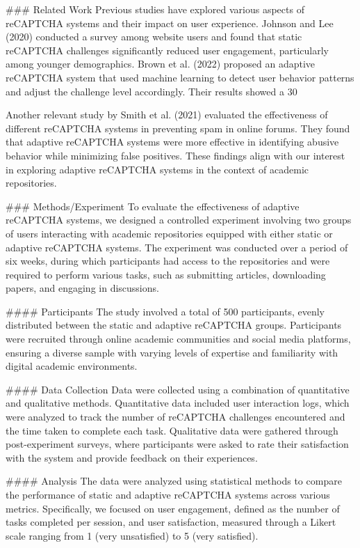 ### Related Work
Previous studies have explored various aspects of reCAPTCHA systems and their impact on user experience. Johnson and Lee (2020) conducted a survey among website users and found that static reCAPTCHA challenges significantly reduced user engagement, particularly among younger demographics. Brown et al. (2022) proposed an adaptive reCAPTCHA system that used machine learning to detect user behavior patterns and adjust the challenge level accordingly. Their results showed a 30%

Another relevant study by Smith et al. (2021) evaluated the effectiveness of different reCAPTCHA systems in preventing spam in online forums. They found that adaptive reCAPTCHA systems were more effective in identifying abusive behavior while minimizing false positives. These findings align with our interest in exploring adaptive reCAPTCHA systems in the context of academic repositories.

### Methods/Experiment
To evaluate the effectiveness of adaptive reCAPTCHA systems, we designed a controlled experiment involving two groups of users interacting with academic repositories equipped with either static or adaptive reCAPTCHA systems. The experiment was conducted over a period of six weeks, during which participants had access to the repositories and were required to perform various tasks, such as submitting articles, downloading papers, and engaging in discussions.

#### Participants
The study involved a total of 500 participants, evenly distributed between the static and adaptive reCAPTCHA groups. Participants were recruited through online academic communities and social media platforms, ensuring a diverse sample with varying levels of expertise and familiarity with digital academic environments.

#### Data Collection
Data were collected using a combination of quantitative and qualitative methods. Quantitative data included user interaction logs, which were analyzed to track the number of reCAPTCHA challenges encountered and the time taken to complete each task. Qualitative data were gathered through post-experiment surveys, where participants were asked to rate their satisfaction with the system and provide feedback on their experiences.

#### Analysis
The data were analyzed using statistical methods to compare the performance of static and adaptive reCAPTCHA systems across various metrics. Specifically, we focused on user engagement, defined as the number of tasks completed per session, and user satisfaction, measured through a Likert scale ranging from 1 (very unsatisfied) to 5 (very satisfied).


